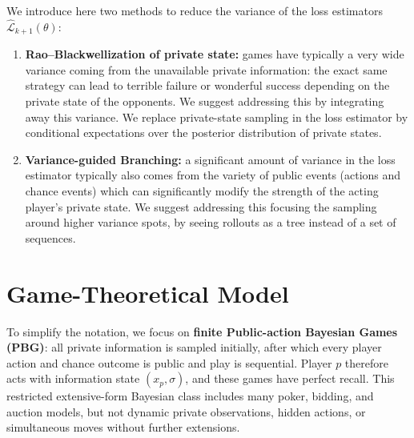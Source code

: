 \documentclass[12pt, a4paper]{article}
\begin{document}
We introduce here two methods to reduce the variance of the loss estimators $\widehat{\mathcal{L}}_{k+1}(\theta)$:
\begin{enumerate}[label =(\roman*)]
  \item \textbf{Rao--Blackwellization of private state:} games have typically a very wide variance coming from the unavailable private information: the exact same strategy can lead to terrible failure or wonderful success depending on the private state of the opponents.
  We suggest addressing this by integrating away this variance.
  We replace private-state sampling in the loss estimator by conditional expectations over the posterior distribution of private states.

  \item \textbf{Variance-guided Branching:} a significant amount of variance in the loss estimator typically also comes from the variety of public events (actions and chance events) which can significantly modify the strength of the acting player's private state.
  We suggest addressing this focusing the sampling around higher variance spots, by seeing rollouts as a tree instead of a set of sequences.
\end{enumerate}

\section{Game-Theoretical Model}\label{sec:pbg}

To simplify the notation, we focus on \textbf{finite Public-action Bayesian Games (PBG)}: all private information is sampled initially, after which every player action and chance outcome is public and play is sequential.
Player $p$ therefore acts with information state $(x_p,\sigma)$, and these games have perfect recall.
This restricted extensive-form Bayesian class includes many poker, bidding, and auction models, but not dynamic private observations, hidden actions, or simultaneous moves without further extensions.
\end{document}
